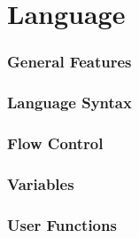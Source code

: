 \part{Language}
	\section{General Features}
	\section{Language Syntax}
	\section{Flow Control}
	\section{Variables}
	\section{User Functions}